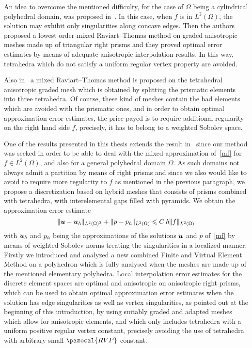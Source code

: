 \tetsTikz

An idea to overcome the mentioned difficulty, for the case of $\Omega$ being a 
cylindrical polyhedral domain, 
was proposed in~\cite{MR1866274}. In  this case, when $f$ is in $L^2(\Omega)$, 
the solution may exhibit only singularities along concave edges.
Then the authors proposed a lowest order mixed Raviart--Thomas method on graded 
anisotropic meshes made up of triangular right prisms and they proved optimal error 
estimates by means of adequate anisotropic interpolation results. 
In this way, tetrahedra which do not satisfy a
uniform regular vertex property are avoided.

Also in~\cite{MR1866274} a mixed Raviart--Thomas method is 
proposed on the tetrahedral 
anisotropic graded mesh which is obtained by splitting the prismatic elements 
into three tetrahedra. Of course, these kind of meshes contain the bad elements 
which are avoided with the prismatic ones, and in order to obtain optimal 
approximation error estimates, the price payed is to require additional regularity 
on the right hand side $f$, precisely, it has to belong to a weighted Sobolev space.

One of the results presented in this thesis extends
the result in~\cite{MR1866274} since our method was seeked in order to be able 
to deal with the mixed approximation of~\eqref{mf} for $f\in L^2(\Omega)$,
and also for a general polyhedral domain $\Omega$. As such domains not always 
admit a partition by means of right prisms and since 
we also would like to avoid to require more regularity to $f$ as mentioned in 
the previous paragraph, we propose a 
discretization based on hybrid meshes that consists of prisms combined with 
tetrahedra, with 
interelemental gaps filled with pyramids. We obtain 
the approximation error estimate
\begin{equation}\label{auxlabel401}
 \|\boldsymbol{u}-\boldsymbol{u}_{\textit h}\|_{L^2(\Omega)^3} + \|p-p_{\textit h}\|_{L^2(\Omega)} 
 \leqslant C\,\textit{h}\|f\|_{L^2(\Omega)}
\end{equation}
with $\boldsymbol{u}_{\textit h}$ and $p_{\textit h}$ being the approximations of the 
solutions $\boldsymbol{u}$ and $p$ of~\eqref{mf} by means of weighted Sobolev norms
treating the singularities in a localized manner. 
Firstly we introduced and analyzed a new 
combined Finite and Virtual 
Element Method on a polyhedron which is fully analysed when the meshes are made 
up of the mentioned elementary polyhedra. Local 
interpolation error estimates for the discrete element spaces are 
optimal and anisotropic on anisotropic right prisms, which can be
used to obtain optimal approximation error estimates when the 
solution has edge singularities as well as vertex singularities, as pointed out at the beginning of 
this introduction, by using suitably graded and adapted meshes which 
allow for anisotropic elements, and which only includes tetrahedra with a
uniform positive regular vertex constant, precisely avoiding the use of tetrahedra
with arbitrary small $\pazocal{RVP}$ constant.

